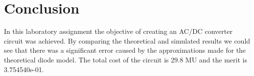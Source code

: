 \pagebreak
\section{Conclusion}
\label{sec:conclusion}

In this laboratory assignment the objective of creating an AC/DC converter circuit was achieved. By comparing the theoretical and simulated results we could see that there was a significant error caused by the approximations made for the theoretical diode model.
The total cost of the circuit is 29.8 MU and the merit is 3.754540e-01.


